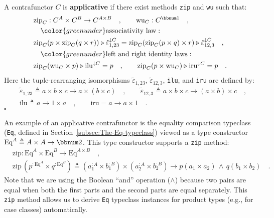 A contrafunctor $C$ is \textbf{applicative} if there exist methods
\lstinline!zip! and \lstinline!wu! such that:
\begin{align}
 & \text{zip}_{C}:C^{A}\times C^{B}\rightarrow C^{A\times B}\quad,\quad\quad\text{wu}_{C}:C^{\bbnum 1}\quad,\nonumber \\
 & \quad{\color{greenunder}\text{associativity law}:}\quad\nonumber \\
 & \text{zip}_{C}(p\times\text{zip}_{C}(q\times r))\triangleright\tilde{\varepsilon}_{1,23}^{\downarrow C}=\text{zip}_{C}(\text{zip}_{C}(p\times q)\times r)\triangleright\tilde{\varepsilon}_{12,3}^{\downarrow C}\quad,\label{eq:applicative-contrafunctor-associativity-law}\\
 & \quad{\color{greenunder}\text{left and right identity laws}:}\quad\nonumber \\
 & \text{zip}_{C}(\text{wu}_{C}\times p)\triangleright\text{ilu}^{\downarrow C}=p\quad,\quad\quad\text{zip}_{C}(p\times\text{wu}_{C})\triangleright\text{iru}^{\downarrow C}=p\quad.\label{eq:applicative-contrafunctor-identity-laws}
\end{align}
Here the tuple-rearranging isomorphisms $\tilde{\varepsilon}_{1,23}$,
$\tilde{\varepsilon}_{12,3}$, \lstinline!ilu!, and \lstinline!iru!
are defined by:
\begin{align*}
 & \tilde{\varepsilon}_{1,23}\triangleq a\times b\times c\rightarrow a\times\left(b\times c\right)\quad,\quad\quad\tilde{\varepsilon}_{12,3}\triangleq a\times b\times c\rightarrow\left(a\times b\right)\times c\quad,\\
 & \text{ilu}\triangleq a\rightarrow1\times a\quad,\quad\quad\text{iru}=a\rightarrow a\times1\quad.
\end{align*}
$\square$

An example of an applicative contrafunctor is the equality comparison
typeclass (\lstinline!Eq!, defined in Section~\ref{subsec:The-Eq-typeclass})
viewed as a type constructor $\text{Eq}^{A}\triangleq A\times A\rightarrow\bbnum 2$.
This type constructor supports a \lstinline!zip! method:
\begin{align*}
 & \text{zip}:\text{Eq}^{A}\times\text{Eq}^{B}\rightarrow\text{Eq}^{A\times B}\quad,\\
 & \text{zip}\,(p^{:\text{Eq}^{A}}\times q^{:\text{Eq}^{B}})\triangleq(a_{1}^{:A}\times b_{1}^{:B})\times(a_{2}^{:A}\times b_{2}^{:B})\rightarrow p(a_{1}\times a_{2})\,\wedge\,q(b_{1}\times b_{2})\quad.
\end{align*}
Note that we are using the Boolean \textsf{``}and\textsf{''} operation ($\wedge$)
because two pairs are equal when both the first parts and the second
parts are equal separately. This \lstinline!zip! method allows us
to derive \lstinline!Eq! typeclass instances for product types (e.g.,
for case classes) automatically.

